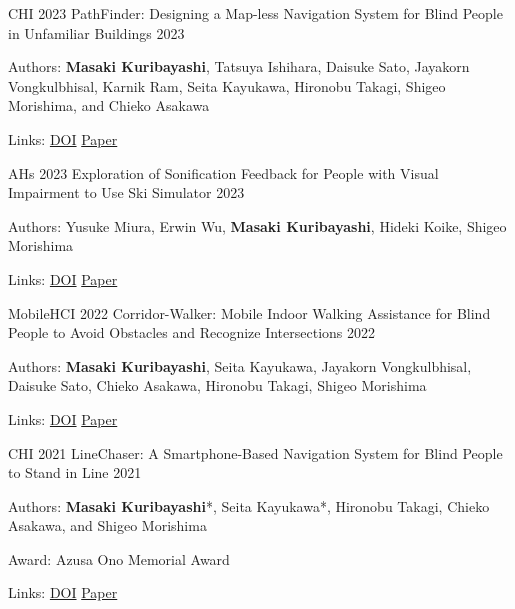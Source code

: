 \begin{cventries}
  \cventry
    {CHI 2023}
    {PathFinder: Designing a Map-less Navigation System for Blind People in Unfamiliar Buildings}
    {}
    {2023}
    {
      \begin{cvitems}
        \item {Authors: \textbf{Masaki Kuribayashi}, Tatsuya Ishihara, Daisuke Sato, Jayakorn Vongkulbhisal, Karnik Ram, Seita Kayukawa, Hironobu Takagi, Shigeo Morishima, and Chieko Asakawa}
        \item {Links: \href{https://doi.org/10.1145/3544548.3580687}{DOI} \enskip\textbar\enskip \href{https://chestnutforestlabo.github.io/website/data/project/masaki_kuribayashi_chi_2023/paper.pdf}{Paper}}
      \end{cvitems}
    }

  \cventry
    {AHs 2023}
    {Exploration of Sonification Feedback for People with Visual Impairment to Use Ski Simulator}
    {}
    {2023}
    {
      \begin{cvitems}
        \item {Authors: Yusuke Miura, Erwin Wu, \textbf{Masaki Kuribayashi}, Hideki Koike, Shigeo Morishima}
        \item {Links: \href{https://doi.org/10.1145/3582700.3582702}{DOI} \enskip\textbar\enskip \href{https://chestnutforestlabo.github.io/website/data/project/yusuke_miura_ahs_2023/paper.pdf}{Paper}}
      \end{cvitems}
    }

  \cventry
    {MobileHCI 2022}
    {Corridor-Walker: Mobile Indoor Walking Assistance for Blind People to Avoid Obstacles and Recognize Intersections}
    {}
    {2022}
    {
      \begin{cvitems}
        \item {Authors: \textbf{Masaki Kuribayashi}, Seita Kayukawa, Jayakorn Vongkulbhisal, Daisuke Sato, Chieko Asakawa, Hironobu Takagi, Shigeo Morishima}
        \item {Links: \href{https://doi.org/10.1145/3546714}{DOI} \enskip\textbar\enskip \href{https://chestnutforestlabo.github.io/website/data/project/masaki_kuribayashi_mobilehci_2022/paper.pdf}{Paper}}
      \end{cvitems}
    }

  \cventry
    {CHI 2021}
    {LineChaser: A Smartphone-Based Navigation System for Blind People to Stand in Line}
    {}
    {2021}
    {
      \begin{cvitems}
        \item {Authors: \textbf{Masaki Kuribayashi}*, Seita Kayukawa*, Hironobu Takagi, Chieko Asakawa, and Shigeo Morishima}
        \item {Award: Azusa Ono Memorial Award}
        \item {Links: \href{https://dl.acm.org/doi/10.1145/3411764.3445451}{DOI} \enskip\textbar\enskip \href{https://chestnutforestlabo.github.io/website/data/project/masaki_kuribayashi_chi_2021/paper.pdf}{Paper}}
      \end{cvitems}
    }


\end{cventries}
